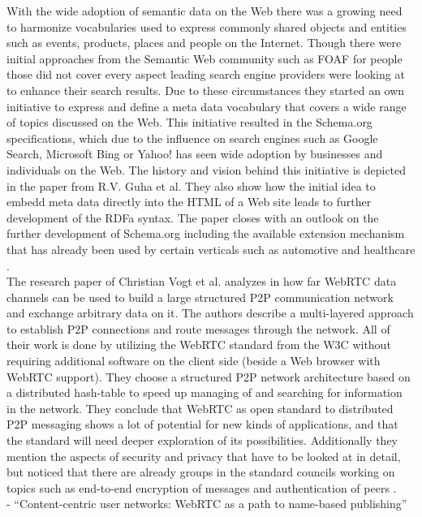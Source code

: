 With the wide adoption of semantic data on the Web there was a growing need to harmonize vocabularies used to express commonly shared objects and entities such as events, products, places and people on the Internet. Though there were initial approaches from the Semantic Web community such as \gls{FOAF} for people those did not cover every aspect leading search engine providers were looking at to enhance their search results. Due to these circumstances they started an own initiative to express and define a meta data vocabulary that covers a wide range of topics discussed on the Web. This initiative resulted in the Schema.org specifications, which due to the influence on search engines such as Google Search, Microsoft Bing or Yahoo! has seen wide adoption by businesses and individuals on the Web. The history and vision behind this initiative is depicted in the paper from R.V. Guha et al. They also show how the initial idea to embedd meta data directly into the \gls{HTML} of a Web site leads to further development of the \gls{RDFa} syntax. The paper closes with an outlook on the further development of Schema.org including the available extension mechanism that has already been used by certain verticals such as automotive and healthcare \citep{guha2016schema}. \\

The research paper of Christian Vogt et al. analyzes in how far \gls{WebRTC} data channels can be used to build a large structured \gls{P2P} communication network and exchange arbitrary data on it. The authors describe a multi-layered approach to establish \gls{P2P} connections and route messages through the network. All of their work is done by utilizing the \gls{WebRTC} standard from the \gls{W3C} without requiring additional software on the client side (beside a Web browser with \gls{WebRTC} support). They choose a structured \gls{P2P} network architecture based on a distributed hash-table to speed up managing of and searching for information in the network. They conclude that \gls{WebRTC} as open standard to distributed \gls{P2P} messaging shows a lot of potential for new kinds of applications, and that the standard will need deeper exploration of its possibilities. Additionally they mention the aspects of security and privacy that have to be looked at in detail, but noticed that there are already groups in the standard councils working on topics such as end-to-end encryption of messages and authentication of peers \citep{vogt2013leveraging}. \\ 

- ``Content-centric user networks: WebRTC as a path to name-based publishing'' \citep{vogt2013content}

